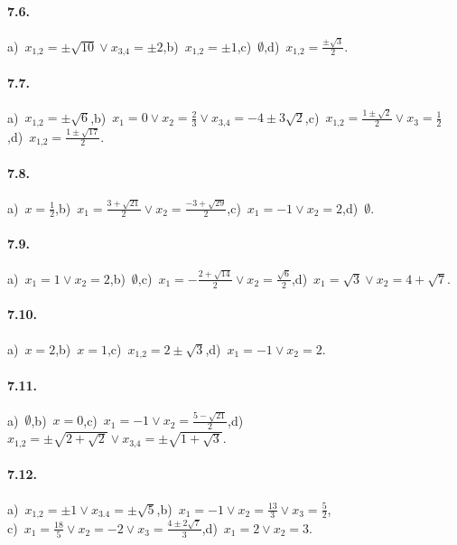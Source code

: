 \paragraph{7.6.} a)~$x_{1\text{,}2}=\pm \sqrt{10}\vee x_{3\text{,}4}=\pm 2$,\quad b)~$x_{1\text{,}2}=\pm 1$,\quad c)~$\emptyset $,\quad d)~$x_{1\text{,}2}=\frac{\pm \sqrt 3} 2$.

\paragraph{7.7.} a)~$x_{1\text{,}2}=\pm \sqrt 6$,\quad b)~$x_1=0\vee x_2=\frac 2 3\vee x_{3\text{,}4}=-4\pm 3\sqrt 2$,\quad c)~$x_{1\text{,}2}=\frac{1\pm \sqrt 2} 2\vee x_3=\frac 1 2$,\quad d)~$x_{1\text{,}2}=\frac{1\pm \sqrt{17}} 2$.

\paragraph{7.8.} a)~$x=\frac 1 2$,\quad b)~$x_1=\frac{3+\sqrt{21}} 2\vee x_2=\frac{-3+\sqrt{29}} 2$,\quad c)~$x_1=-1\vee x_2=2$,\quad d)~$\emptyset $.

\paragraph{7.9.} a)~$x_1=1\vee x_2=2$,\quad b)~$\emptyset $,\quad c)~$x_1=-\frac{2+\sqrt{14}} 2\vee x_2=\frac{\sqrt 6} 2$,\quad d)~$x_1=\sqrt 3\vee x_2=4+\sqrt 7$.

\paragraph{7.10.} a)~$x=2$,\quad b)~$x=1$,\quad c)~$x_{1\text{,}2}=2\pm \sqrt 3$,\quad d)~$x_1=-1\vee x_2=2$.

\paragraph{7.11.} a)~$\emptyset $,\quad b)~$ x=0 $,\quad c)~$x_1=-1\vee x_2=\frac{5-\sqrt{21}} 2$,\quad d)~$x_{1\text{,}2}=\pm \sqrt{2+\sqrt 2}\vee x_{3\text{,}4}=\pm \sqrt{1+\sqrt 3}$.

\paragraph{7.12.} a)~$x_{1\text{,}2}=\pm 1\vee x_{3.4}=\pm \sqrt 5$,\quad b)~$x_1=-1\vee x_2=\frac{13} 3\vee x_3=\frac 5 2$,\protect\\
\quad c)~$x_1=\frac{18} 5\vee x_2=-2\vee x_3=\frac{4\pm 2\sqrt 7} 3$,\quad d)~$x_1=2\vee x_2=3$.

